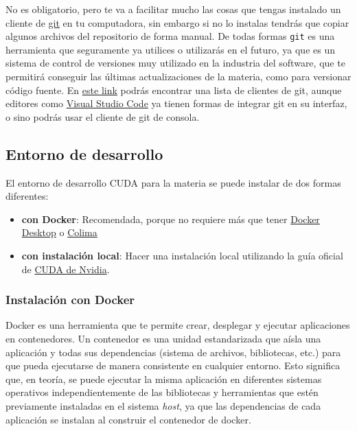 No es obligatorio, pero te va a facilitar mucho las cosas que tengas instalado un cliente de
\href{https://git-scm.com/}{git} en tu computadora, sin embargo si no lo instalas tendrás que copiar algunos archivos
del repositorio de forma manual. De todas formas \texttt{git} es una herramienta que seguramente ya utilices o
utilizarás en el futuro, ya que es un sistema de control de versiones muy utilizado en la industria del software, que te
permitirá conseguir las últimas actualizaciones de la materia, como para versionar código fuente. En
\href{https://git-scm.com/downloads/guis}{este link} podrás encontrar una lista de clientes de git, aunque editores como
\href{https://code.visualstudio.com/}{Visual Studio Code} ya tienen formas de integrar git en su interfaz, o sino podrás
usar el cliente de git de consola.

\subsection{Entorno de desarrollo}

El entorno de desarrollo CUDA para la materia se puede instalar de dos formas diferentes:

\begin{itemize}
  \item \textbf{con Docker}: Recomendada, porque no requiere más que tener
    \href{https://www.docker.com/products/docker-desktop/}{Docker Desktop} o
    \href{https://github.com/abiosoft/colima}{Colima}
  \item \textbf{con instalación local}: Hacer una instalación local utilizando la guía oficial de \href{https://docs.nvidia.com/cuda/cuda-quick-start-guide/index.html}{CUDA de
    Nvidia}.
\end{itemize}

\subsubsection{Instalación con Docker}

Docker es una herramienta que te permite crear, desplegar y ejecutar aplicaciones en contenedores. Un contenedor es una
unidad estandarizada que aísla una aplicación y todas sus dependencias (sistema de archivos, bibliotecas, etc.) para que
pueda ejecutarse de manera consistente en cualquier entorno. Esto significa que, en teoría, se puede ejecutar la misma
aplicación en diferentes sistemas operativos independientemente de las bibliotecas y herramientas que estén previamente
instaladas en el sistema \textit{host}, ya que las dependencias de cada aplicación se instalan al construir el
contenedor de docker.

